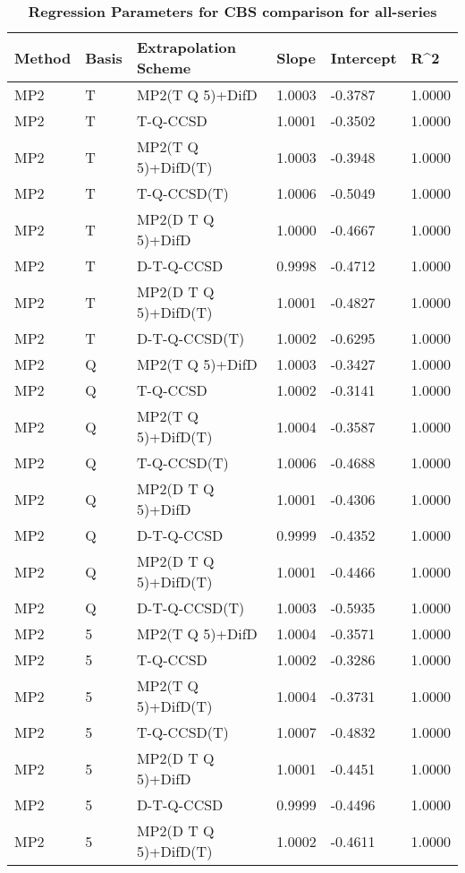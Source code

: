 \begin{table}
  \caption{\textbf{Regression Parameters for CBS comparison for all-series}}
  \label{tbl:regression-two-all}
  \begin{tabular}{l l l l l l }
    \hline
    Method & Basis & Extrapolation Scheme & Slope & Intercept & R^2 \\ 
    \hline
    MP2 & T & MP2(T Q 5)+DifD & 1.0003 & -0.3787 & 1.0000 \\ 
    MP2 & T & T-Q-CCSD & 1.0001 & -0.3502 & 1.0000 \\ 
    MP2 & T & MP2(T Q 5)+DifD(T) & 1.0003 & -0.3948 & 1.0000 \\ 
    MP2 & T & T-Q-CCSD(T) & 1.0006 & -0.5049 & 1.0000 \\ 
    MP2 & T & MP2(D T Q 5)+DifD & 1.0000 & -0.4667 & 1.0000 \\ 
    MP2 & T & D-T-Q-CCSD & 0.9998 & -0.4712 & 1.0000 \\ 
    MP2 & T & MP2(D T Q 5)+DifD(T) & 1.0001 & -0.4827 & 1.0000 \\ 
    MP2 & T & D-T-Q-CCSD(T) & 1.0002 & -0.6295 & 1.0000 \\ 
    MP2 & Q & MP2(T Q 5)+DifD & 1.0003 & -0.3427 & 1.0000 \\ 
    MP2 & Q & T-Q-CCSD & 1.0002 & -0.3141 & 1.0000 \\ 
    MP2 & Q & MP2(T Q 5)+DifD(T) & 1.0004 & -0.3587 & 1.0000 \\ 
    MP2 & Q & T-Q-CCSD(T) & 1.0006 & -0.4688 & 1.0000 \\ 
    MP2 & Q & MP2(D T Q 5)+DifD & 1.0001 & -0.4306 & 1.0000 \\ 
    MP2 & Q & D-T-Q-CCSD & 0.9999 & -0.4352 & 1.0000 \\ 
    MP2 & Q & MP2(D T Q 5)+DifD(T) & 1.0001 & -0.4466 & 1.0000 \\ 
    MP2 & Q & D-T-Q-CCSD(T) & 1.0003 & -0.5935 & 1.0000 \\ 
    MP2 & 5 & MP2(T Q 5)+DifD & 1.0004 & -0.3571 & 1.0000 \\ 
    MP2 & 5 & T-Q-CCSD & 1.0002 & -0.3286 & 1.0000 \\ 
    MP2 & 5 & MP2(T Q 5)+DifD(T) & 1.0004 & -0.3731 & 1.0000 \\ 
    MP2 & 5 & T-Q-CCSD(T) & 1.0007 & -0.4832 & 1.0000 \\ 
    MP2 & 5 & MP2(D T Q 5)+DifD & 1.0001 & -0.4451 & 1.0000 \\ 
    MP2 & 5 & D-T-Q-CCSD & 0.9999 & -0.4496 & 1.0000 \\ 
    MP2 & 5 & MP2(D T Q 5)+DifD(T) & 1.0002 & -0.4611 & 1.0000 \\ 

\end{tabular}
\end{table}
